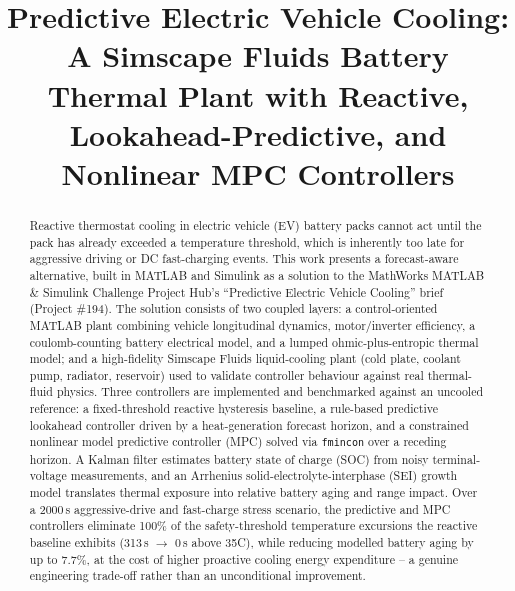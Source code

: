 \documentclass[10pt,conference]{IEEEtran}
\begin{document}
\title{Predictive Electric Vehicle Cooling: A Simscape Fluids Battery Thermal Plant with Reactive, Lookahead-Predictive, and Nonlinear MPC Controllers}

\author{
}

\maketitle

\begin{abstract}
Reactive thermostat cooling in electric vehicle (EV) battery packs cannot act until the pack has already exceeded a temperature threshold, which is inherently too late for aggressive driving or DC fast-charging events. This work presents a forecast-aware alternative, built in MATLAB and Simulink as a solution to the MathWorks MATLAB \& Simulink Challenge Project Hub's ``Predictive Electric Vehicle Cooling'' brief (Project \#194). The solution consists of two coupled layers: a control-oriented MATLAB plant combining vehicle longitudinal dynamics, motor/inverter efficiency, a coulomb-counting battery electrical model, and a lumped ohmic-plus-entropic thermal model; and a high-fidelity Simscape Fluids liquid-cooling plant (cold plate, coolant pump, radiator, reservoir) used to validate controller behaviour against real thermal-fluid physics. Three controllers are implemented and benchmarked against an uncooled reference: a fixed-threshold reactive hysteresis baseline, a rule-based predictive lookahead controller driven by a heat-generation forecast horizon, and a constrained nonlinear model predictive controller (MPC) solved via \texttt{fmincon} over a receding horizon. A Kalman filter estimates battery state of charge (SOC) from noisy terminal-voltage measurements, and an Arrhenius solid-electrolyte-interphase (SEI) growth model translates thermal exposure into relative battery aging and range impact. Over a 2000\,s aggressive-drive and fast-charge stress scenario, the predictive and MPC controllers eliminate 100\% of the safety-threshold temperature excursions the reactive baseline exhibits (313\,s $\rightarrow$ 0\,s above 35\textdegree C), while reducing modelled battery aging by up to 7.7\%, at the cost of higher proactive cooling energy expenditure -- a genuine engineering trade-off rather than an unconditional improvement.
\end{abstract}
\end{document}
